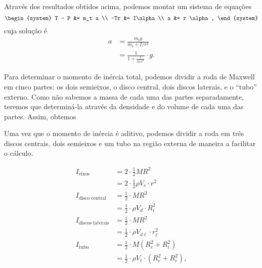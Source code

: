 Através dos resultados obtidos acima, podemos montar um sistema de equações
\begin{equation}
\begin{system}
    T - P &= m_t a \\
    -Tr &= I\alpha \\
    a &= r \alpha,
\end{system}
\end{equation}
%
cuja solução é
\begin{align}
    a &= \frac{m_t g}{m_t + I / r^2} \\
    &= \frac{1}{1+\frac{I}{m_t r^2}} \cdot g. \label{Eq:AcelRodaDeMaxwellGenerica}
\end{align}

Para determinar o momento de inércia total, podemos dividir a roda de Maxwell em cinco partes: os dois semieixos, o disco central, dois discos laterais, e o ``tubo'' externo. Como não sabemos a massa de cada uma das partes separadamente, teremos que determiná-la através da densidade e do volume de cada uma das partes. Assim, obtemos
\begin{marginfigure}
    \centering
    \caption{Uma vez que o momento de inércia é aditivo, podemos dividir a roda em três discos centrais, dois semieixos e um tubo na região externa de maneira a facilitar o cálculo.\label{Fig:RodaDeMaxwellDecomposicao}}
\end{marginfigure}
%
\begin{align}
    I_{\text{eixos}} &= 2\cdot\frac{1}{2} MR^2 \\
    &=2\cdot \frac{1}{2} \rho V_e \cdot r^2 \\
    I_{\text{disco central}} &= \frac{1}{2} \cdot MR^2 \\
    &= \frac{1}{2} \cdot\rho V_d \cdot R_i^2 \\
    I_{\text{discos laterais}} &= \frac{1}{2} \cdot MR^2 \\
    &= \frac{1}{2} \cdot\rho V_{d\ell} \cdot r_{\ell}^2 \\
    I_{\text{tubo}} &= \frac{1}{2} \cdot M (R_e^2 + R_i^2) \\
    &= \frac{1}{2} \cdot \rho V_t \cdot (R_e^2 + R_i^2),
\end{align}
